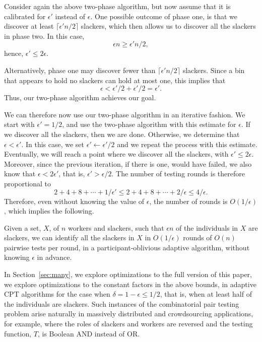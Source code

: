 \documentclass[11pt]{llncs}
\begin{document}
Consider again the above two-phase algorithm, but now 
assume that it is calibrated for $\epsilon'$ instead of $\epsilon$.
One possible outcome of phase one, is that we discover
at least $\lceil \epsilon' n/2\rceil$ slackers, which then allows us 
to discover all the slackers in phase two.
In this case,
\[
\epsilon n \ge \epsilon' n/2,
\]
hence,
$\epsilon' \le 2\epsilon$.

Alternatively,
phase one may discover fewer than 
$\lceil \epsilon' n/2\rceil$ slackers. 
Since a bin that appears to hold no slackers can hold at most one,
this implies that 
\[
\epsilon<\epsilon'/2 + \epsilon'/2=\epsilon'.
\]
Thus, our two-phase algorithm achieves our goal.

We can therefore now use our two-phase algorithm 
in an iterative fashion. We start with $\epsilon'=1/2$, and use the two-phase
algorithm with this estimate for $\epsilon$.
If we discover all the slackers, then we are done.
Otherwise, we determine that $\epsilon<\epsilon'$. 
In this case, we set
$\epsilon'\leftarrow \epsilon'/2$ and we repeat the process with this
estimate.
Eventually, we will reach a point where we discover all the slackers, with
$\epsilon'\le 2\epsilon$.
Moreover, since the previous iteration, if there is one, would have 
failed, we also know that $\epsilon<2\epsilon'$, that is, 
$\epsilon'>\epsilon/2$.
The number of testing rounds is therefore proportional to
\[
2+4+8+\cdots + 1/\epsilon' \le 
2+4+8+\cdots + 2/\epsilon \le 4/\epsilon.
\]
Therefore, even without knowing the value of $\epsilon$,
the number of rounds is $O(1/\epsilon)$,
which implies the following.

\begin{theorem}
Given a set, $X$, of $n$ workers and slackers, such that $\epsilon n$ of the
individuals in $X$ are slackers, 
we can identify all the slackers in $X$
in $O(1/\epsilon)$ rounds of $O(n)$ pairwise tests
per round, in a participant-oblivious adaptive algorithm, 
without knowing $\epsilon$ in advance.
\end{theorem}

In
\ifFull
Section~\ref{sec:many}, we explore optimizations to
\else
the full version of this paper, we explore optimizations to
\fi
the constant factors in
the above bounds, in adaptive CPT algorithms
for the case when $\delta=1-\epsilon\le 1/2$, that is, when at least half
of the individuals are slackers.
Such instances of the combinatorial pair testing problem arise naturally
in massively distributed and crowdsourcing applications, for example,
where the roles of slackers and workers are reversed and the testing
function, $T$, is Boolean AND instead of OR.
\end{document}
